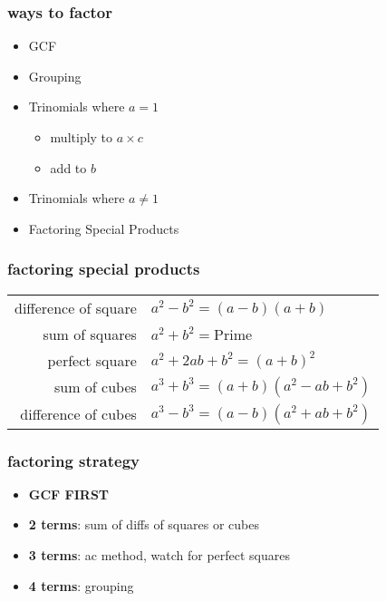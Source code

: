 \documentclass[a4paper,12pt]{article}
\begin{document}
\subsubsection{ways to factor}

\begin{itemize}
        \item GCF
        \item Grouping
        \item Trinomials where \( a = 1 \)
              \begin{itemize}
                      \item multiply to \( a \times c \)
                      \item add to \( b \)
              \end{itemize}

        \item Trinomials where \( a \neq 1 \)
        \item Factoring Special Products

\end{itemize}

\subsubsection{factoring special products}

\begin{center}

\begin{tabular}{r l}
    difference of square & \( a^{2}-b^{2}=(a-b)(a+b) \) \\
    sum of squares & \( a^{2} + b^{2} = \text{Prime} \) \\
    perfect square & \(  a^{2} + 2ab + b^{2} =  (a+b)^{2} \) \\
    sum of cubes & \( a^{3} + b^{3} = (a+b)( a^{2} -ab + b^{2} ) \) \\
    difference of cubes & \( a^{3} - b^{3} = (a-b)( a^{2} +ab + b^{2} ) \)
\end{tabular}
\end{center}

\subsubsection{factoring strategy}

\begin{itemize}
    \item \textbf{GCF FIRST}
    \item \textbf{2 terms}: sum of diffs of squares or cubes
    \item \textbf{3 terms}: ac method, watch for perfect squares
    \item \textbf{4 terms}: grouping
\end{itemize}
\end{document}
